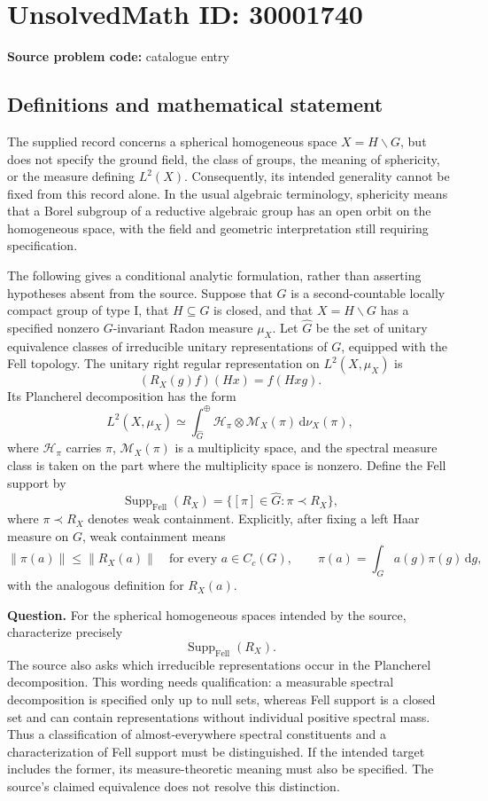 \documentclass[11pt]{article}
\begin{document}
\section*{UnsolvedMath ID: 30001740}
\textbf{Source problem code:} catalogue entry
\subsection{Definitions and mathematical statement}
The supplied record concerns a spherical homogeneous space \(X=H\backslash G\), but does not specify the ground field, the class of groups, the meaning of sphericity, or the measure defining \(L^2(X)\). Consequently, its intended generality cannot be fixed from this record alone. In the usual algebraic terminology, sphericity means that a Borel subgroup of a reductive algebraic group has an open orbit on the homogeneous space, with the field and geometric interpretation still requiring specification.

The following gives a conditional analytic formulation, rather than asserting hypotheses absent from the source. Suppose that \(G\) is a second-countable locally compact group of type I, that \(H\subseteq G\) is closed, and that \(X=H\backslash G\) has a specified nonzero \(G\)-invariant Radon measure \(\mu_X\). Let \(\widehat G\) be the set of unitary equivalence classes of irreducible unitary representations of \(G\), equipped with the Fell topology. The unitary right regular representation on \(L^2(X,\mu_X)\) is
\[
 (R_X(g)f)(Hx)=f(Hxg).
\]
Its Plancherel decomposition has the form
\[
 L^2(X,\mu_X)\simeq
 \int_{\widehat G}^{\oplus}
 \mathcal H_\pi\otimes\mathcal M_X(\pi)\,\mathrm d\nu_X(\pi),
\]
where \(\mathcal H_\pi\) carries \(\pi\), \(\mathcal M_X(\pi)\) is a multiplicity space, and the spectral measure class is taken on the part where the multiplicity space is nonzero. Define the Fell support by
\[
 \operatorname{Supp}_{\mathrm{Fell}}(R_X)
 =\{[\pi]\in\widehat G:\pi\prec R_X\},
\]
where \(\pi\prec R_X\) denotes weak containment. Explicitly, after fixing a left Haar measure on \(G\), weak containment means
\[
 \|\pi(a)\|\leq\|R_X(a)\|
 \quad\text{for every }a\in C_c(G),
 \qquad
 \pi(a)=\int_G a(g)\pi(g)\,\mathrm dg,
\]
with the analogous definition for \(R_X(a)\).

\textbf{Question.} For the spherical homogeneous spaces intended by the source, characterize precisely
\[
 \operatorname{Supp}_{\mathrm{Fell}}(R_X).
\]
The source also asks which irreducible representations occur in the Plancherel decomposition. This wording needs qualification: a measurable spectral decomposition is specified only up to null sets, whereas Fell support is a closed set and can contain representations without individual positive spectral mass. Thus a classification of almost-everywhere spectral constituents and a characterization of Fell support must be distinguished. If the intended target includes the former, its measure-theoretic meaning must also be specified. The source's claimed equivalence does not resolve this distinction.
\end{document}

